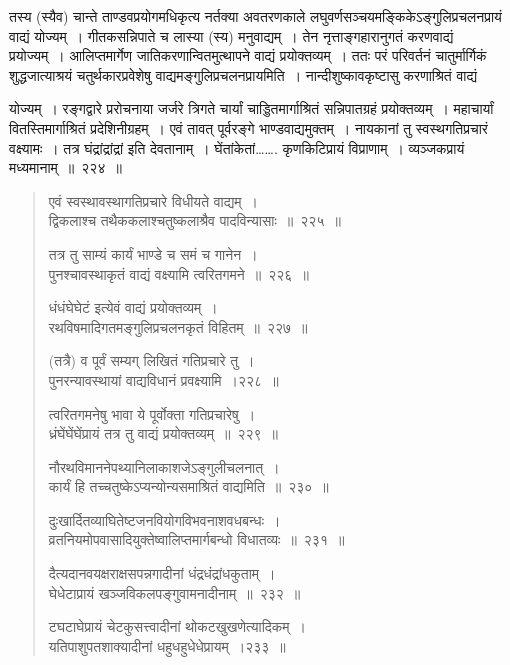 \documentclass[11pt, openany]{book}
\begin{document}
{\qt तस्य (स्यैव) चान्ते ताण्डवप्रयोगमधिकृत्य नर्तक्या अवतरणकाले लघुवर्णसञ्चयमङ्किकेऽङ्गुलिप्रचलनप्रायं वाद्यं योज्यम्~। गीतकसन्निपाते च लास्या  (स्य) मनुवाद्यम्~। तेन नृत्ताङ्गहारानुगतं करणवाद्यं प्रयोज्यम्~। आलिप्तमार्गेण जातिकरणान्वितमुत्थापने वाद्यं प्रयोक्तव्यम्~। ततः परं परिवर्तनं चातुर्मार्गिकं शुद्धजात्याश्रयं चतुर्थकारप्रवेशेषु वाद्यमङ्गुलिप्रचलनप्रायमिति~। नान्दीशुष्कावकृष्टासु करणाश्रितं वाद्यं}



\newpage

\noindent
{\qt योज्यम्~। रङ्गद्वारे प्ररोचनाया जर्जरे त्रिगते चार्यां चाड्डितमार्गाश्रितं सन्निपातग्रहं प्रयोक्तव्यम्~। महाचार्यां वितस्तिमार्गाश्रितं प्रदेशिनीग्रहम्~। एवं तावत् पूर्वरङ्गे भाण्डवाद्यमुक्तम्~। नायकानां तु स्वस्थगतिप्रचारं वक्ष्यामः~। तत्र घंद्रांद्रांद्रां इति देवतानाम्~। घेंतांकेतां\ldots\ldots. कृणकिटिप्रायं विप्राणाम्~। व्यञ्जकप्रायं मध्यमानाम्~॥~२२४~॥}

\begin{quote}
{\na एवं स्वस्थावस्थागतिप्रचारे विधीयते वाद्यम्~।\\
 द्विकलाश्च तथैककलाश्चतुष्कलाश्रैव पादविन्यासाः~॥~२२५~॥

 तत्र तु साम्यं कार्यं भाण्डे च समं च गानेन~।\\
 पुनश्चावस्थाकृतं वाद्यं वक्ष्यामि त्वरितगमने~॥~२२६~॥

 धंधंघेघेटं इत्येवं वाद्यं प्रयोक्तव्यम्~।\\
 रथविषमादिगतमङ्गुलिप्रचलनकृतं विहितम्~॥~२२७~॥

 (तत्रै) व पूर्वं सम्यग् लिखितं गतिप्रचारे तु~।\\
 पुनरन्यावस्थायां वाद्यविधानं प्रवक्ष्यामि~।२२८~॥

 त्वरितगमनेषु भावा ये पूर्वोक्ता गतिप्रचारेषु~।\\
 ध्रंघेंघेंघेंप्रायं तत्र तु वाद्यं प्रयोक्तव्यम्~॥~२२९~॥

 नौरथविमाननेपथ्यानिलाकाशजेऽङ्गुलीचलनात्~।\\
 कार्यं हि तच्चतुष्केऽप्यन्योन्यसमाश्रितं वाद्यमिति~॥~२३०~॥

 दुःखार्दितव्याघितेष्टजनवियोगविभवनाशवधबन्धः~।\\
 व्रतनियमोपवासादियुक्तेष्वालिप्तमार्गबन्धो विधातव्यः~॥~२३१~॥

 दैत्यदानवयक्षराक्षसपन्नगादीनां धंद्रधंद्रांधकुताम्~।\\
 घेधेटाप्रायं खञ्जविकलपङ्गुवामनादीनाम्~॥~२३२~॥

 टघटाघेप्रायं चेटकुसत्त्वादीनां थोकटखुखणेत्यादिकम्~।\\
 यतिपाशुपतशाक्यादीनां धहुधहुधेधेप्रायम्~।२३३~॥}
\end{quote}
\end{document}
